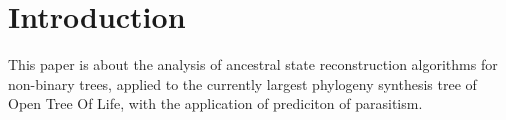 \tableofcontents
\clearpage

\chapter{Introduction}
  This paper is about the analysis of ancestral state reconstruction algorithms for non-binary trees, 
    applied to the currently largest phylogeny synthesis tree of Open Tree Of Life, with the 
    application of prediciton of parasitism. \\

